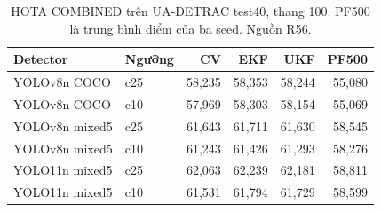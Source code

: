 \begin{table}[htbp]\centering\small
\caption{HOTA COMBINED trên UA-DETRAC test40, thang 100. PF500 là trung bình điểm của ba seed. Nguồn R56.}\label{tab:ua}
\begin{tabular}{llrrrr}\hline
Detector & Ngưỡng & CV & EKF & UKF & PF500\\\hline
YOLOv8n COCO & c25 & 58,235 & 58,353 & 58,244 & 55,080\\
YOLOv8n COCO & c10 & 57,969 & 58,303 & 58,154 & 55,069\\
YOLOv8n mixed5 & c25 & 61,643 & 61,711 & 61,630 & 58,545\\
YOLOv8n mixed5 & c10 & 61,243 & 61,426 & 61,293 & 58,276\\
YOLO11n mixed5 & c25 & 62,063 & 62,239 & 62,181 & 58,811\\
YOLO11n mixed5 & c10 & 61,531 & 61,794 & 61,729 & 58,599\\
\hline\end{tabular}\end{table}

